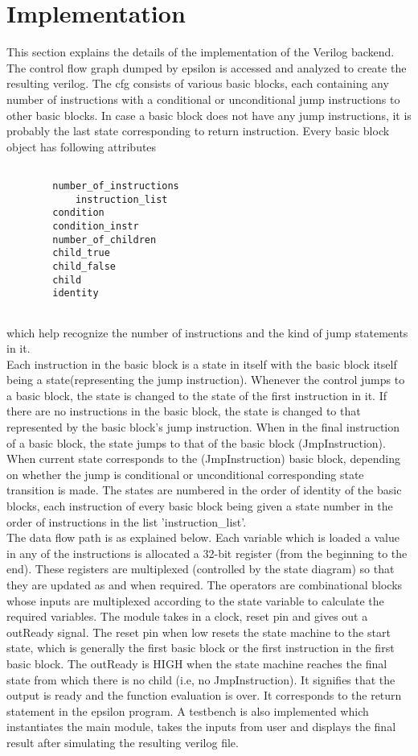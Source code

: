 \documentclass{article}
\begin{document}
    \section{Implementation}
        This section explains the details of the implementation of the Verilog backend. The control flow graph dumped by epsilon is accessed and analyzed to create the resulting verilog. The cfg consists of various basic blocks, each containing any number of instructions with a conditional or unconditional jump instructions to other basic blocks. In case a basic block does not have any jump instructions, it is probably the last state corresponding to return instruction.
        Every basic block object has following attributes 
        \begin{verbatim}
        
        number_of_instructions
            instruction_list
        condition
        condition_instr
        number_of_children
        child_true
        child_false
        child
        identity
        
        \end{verbatim} which help recognize the number of instructions and the kind of jump statements in it. \\Each instruction in the basic block is a state in itself with the basic block itself being a state(representing the jump instruction). Whenever the control jumps to a basic block, the state is changed to the state of the first instruction in it. If there are no instructions in the basic block, the state is changed to that represented by the basic block's jump instruction. When in the final instruction of a basic block, the state jumps to that of the basic block (JmpInstruction). When current state corresponds to the (JmpInstruction) basic block, depending on whether the jump is conditional or unconditional corresponding state transition is made. The states are numbered in the order of identity of the basic blocks, each instruction of every basic block being given a state number in the order of instructions in the list 'instruction\_list'.\\ The data flow path is as explained below. Each variable which is loaded a value in any of the instructions is allocated a 32-bit register (from the beginning to the end). These registers are multiplexed (controlled by the state diagram) so that they are updated as and when required. The operators are combinational blocks whose inputs are multiplexed according to the state variable to calculate the required variables. The module takes in a clock, reset pin and gives out a outReady signal. The reset pin when low resets the state machine to the start state, which is generally the first basic block or the first instruction in the first basic block. The outReady is HIGH when the state machine reaches the final state from which there is no child (i.e, no JmpInstruction). It signifies that the output is ready and the function evaluation is over. It corresponds to the return statement in the epsilon program.
        A testbench is also implemented which instantiates the main module, takes the inputs from user and displays the final result after simulating the resulting verilog file.
\end{document}
